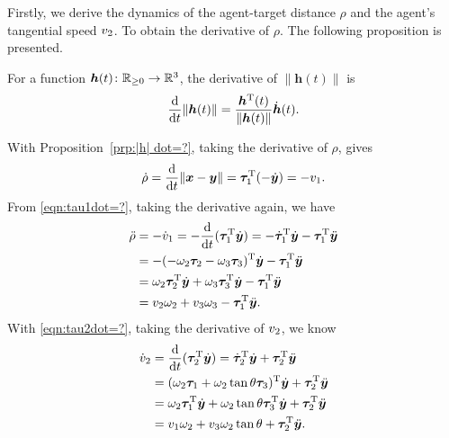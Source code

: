 \documentclass[5p,authoryear,preprint]{elsarticle}\linenofalse
\begin{document}
Firstly, we derive the dynamics of the agent-target distance $\rho$ and the agent's tangential speed $v_2$.
To obtain the derivative of $\rho$.
The following proposition is presented.

\begin{proposition}\label{prp:|h| dot=?}
For a function $\bm h(t)\colon\mathbb{R}_{\ge0}\to\mathbb{R}^3$, the derivative of $\|\bm h(t)\|$ is
\[
\frac{\mathrm d}{\mathrm dt}\|\bm h(t)\|=\frac{\bm h^{\mathrm{T}}(t)}{\|\bm h(t)\|}\dot{\bm h}(t).
\]
\end{proposition}

With Proposition~\ref{prp:|h| dot=?}, taking the derivative of $\rho$, gives
\begin{equation}\label{eqn:rhodot=-v1}
	\dot{\rho}=\frac{\mathrm d}{\mathrm dt}\|\bm{x}-\bm{y}\|=\bm{\tau}_1^\mathrm{T}(-\dot{\bm{y}})=-v_1.
\end{equation}
From \eqref{eqn:tau1dot=?}, taking the derivative again, we have
\begin{equation}\label{eqn:rhoddot=?}
	\begin{aligned}
		\ddot{\rho}&=-\dot{v}_1=-\frac{\mathrm d}{\mathrm dt}(\bm{\tau}_1^\mathrm{T}\dot{\bm{y}})=-\dot{\bm{\tau}}_1^\mathrm{T}\dot{\bm{y}}-\bm{\tau}_1^\mathrm{T}\ddot{\bm{y}}\\
		&=-(-\omega_2\bm{\tau}_2-\omega_3\bm{\tau}_3)^{\mathrm{T}}\dot{\bm{y}}-\bm{\tau}_1^\mathrm{T}\ddot{\bm{y}}\\
		&=\omega_2\bm{\tau}_2^\mathrm{T}\dot{\bm{y}}+\omega_3\bm{\tau}_3^\mathrm{T}\dot{\bm{y}}-\bm{\tau}_1^\mathrm{T}\ddot{\bm{y}}\\
		&=v_2\omega_2+v_3\omega_3-\bm{\tau}_1^\mathrm{T}\ddot{\bm{y}}.
	\end{aligned}
\end{equation}
With \eqref{eqn:tau2dot=?}, taking the derivative of $v_2$, we know
\begin{equation}\begin{aligned}\label{eqn:v2dot=?}
		\dot{v}_2&=\frac{\mathrm d}{\mathrm dt}(\bm{\tau}_2^\mathrm{T}\dot{\bm{y}})=\dot{\bm{\tau}}_2^\mathrm{T}\dot{\bm{y}}+\bm{\tau}_2^\mathrm{T}\ddot{\bm{y}}\\
		&=(\omega_2\bm{\tau}_1+\omega_2\tan\theta\bm{\tau}_3)^{\mathrm{T}}\dot{\bm{y}}+\bm{\tau}_2^\mathrm{T}\ddot{\bm{y}}\\
		&=\omega_2\bm{\tau}_1^\mathrm{T}\dot{\bm{y}}+\omega_2\tan\theta\bm{\tau}_3^\mathrm{T}\dot{\bm{y}}+\bm{\tau}_2^\mathrm{T}\ddot{\bm{y}}\\
		&=v_1\omega_2+v_3\omega_2\tan\theta+\bm{\tau}_2^\mathrm{T}\ddot{\bm{y}}.
\end{aligned}\end{equation}
\end{document}
